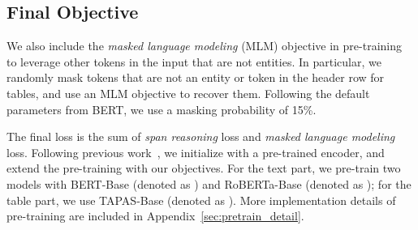 \documentclass[11pt]{article}
\newcommand{\nop}[1]{}
\newcommand{\ours}[0]{\text{ReasonBERT}}
\begin{document}
\nop{
\subsection{Table Cell Selection}
To help the model learn to reason over tables, we also include a cell selection objective. In addition to predict the start and end location of the target entity, the model is taught to select the row and column by aggregating information from all cells in the that row or column. More specifically, we calculate the probability of target $a$ belongs to row $r_j$ as follows:
\begin{equation}\small{
\begin{aligned}
    S_{cell}&=\mathrm{mean}_{x_i \in cell}\left(\mathbf{x}_{i}^{\top} \mathbf{R} \mathbf{x}_{a}\right)\\
    P(r_a=j \mid q, E)&=\frac{\exp \left(\max_{cell \in r_j}S_{cell}\right)}{\sum_{k} \exp \left(\max_{cell \in r_k}S_{cell}\right)}
\end{aligned}
}\end{equation}
Here $\mathbf{R}$ is the weight matrix of row selection header, and the column selection probability is calculated similarly with another column selection header. We first score each cell by averaging over all tokens in that cell. We then do a max pooling over all cells in the row or column so the model can focus on the strongest signal, for example the column header. The \textit{cell selection} loss is then calculated as follows:
\begin{equation}\small{
    L_{CS} = -\sum_{a_i \in \mathcal{A}} \left(\mathrm{log}P\left(r_{a_i}|q,E\right)+ \mathrm{log}P\left(c_{a_i}|q,E\right)\right)
}\end{equation}
}

\subsection{Final Objective}
We also include the \textit{masked language modeling} (MLM) objective in pre-training to leverage other tokens in the input that are not entities. In particular, we randomly mask tokens that are not an entity or token in the header row for tables, and use an MLM objective to recover them. Following the default parameters from BERT, we use a masking probability of 15\%.

The final loss\nop{ for pre-training} is the sum of \textit{span reasoning} loss and \textit{masked language modeling} loss. {Following previous work~\cite{glass-etal-2020-span, herzig-etal-2020-tapas}, we initialize with a pre-trained encoder, and extend the pre-training with our objectives. For the text part, we pre-train two models with BERT-Base (denoted as \ours{\scriptsize{B}}) and RoBERTa-Base (denoted as \ours{\scriptsize{R}}); for the table part, we use TAPAS-Base (denoted as \ours{\scriptsize{T}}).} More implementation details of pre-training are included in Appendix~\ref{sec:pretrain_detail}.
\end{document}
